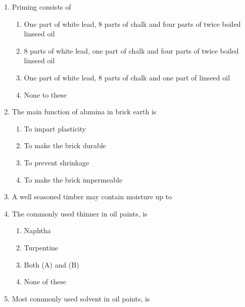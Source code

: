\documentclass[11pt,a4paper]{article}
\begin{document}
\begin{enumerate}
\item{Priming consists of}
\begin{enumerate}[label=\Alph*.]
\item{One part of white lead, 8 parts of chalk and four parts of twice boiled linseed oil}
\item{8 parts of white lead, one part of chalk and four parts of twice boiled linseed oil}
\item{One part of white lead, 8 parts of chalk and one part of linseed oil}
\item{None to these}
\end{enumerate}
\item{The main function of alumina in brick earth is}
\begin{enumerate}[label=\Alph*.]
\item{To impart plasticity}
\item{To make the brick durable}
\item{To prevent shrinkage}
\item{To make the brick impermeable}
\end{enumerate}
\item{A well seasoned timber may contain moisture up to}
\\
\item{The commonly used thinner in oil paints, is}
\begin{enumerate}[label=\Alph*.]
\item{Naphtha}
\item{Turpentine}
\item{Both (A) and (B)}
\item{None of these}
\end{enumerate}
\item{Most commonly used solvent in oil paints, is}
\\
\end{enumerate}
\end{document}
